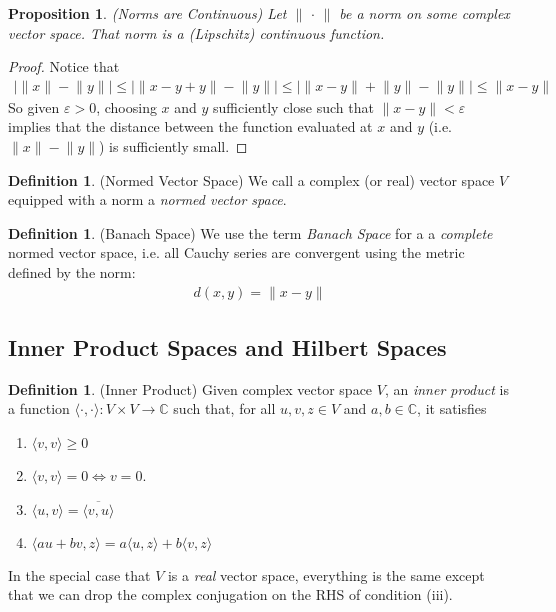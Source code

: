 \documentclass[12pt]{article}
\numberwithin{equation}{section} %
\theoremstyle{plain}
\newtheorem{prop}[thm]{Proposition}
\theoremstyle{definition}
\newtheorem{defn}[thm]{Definition}
\theoremstyle{remark}
\newcommand{\ra}{\rightarrow}
\newcommand{\C}{\mathbb{C}}
\begin{document}
\begin{prop}\emph{(Norms are Continuous)}
Let $\lVert \,\cdot\,\rVert$ be a norm on some complex vector space.
That norm is a (Lipschitz) continuous function.
\end{prop}
\begin{proof}
Notice that
\begin{align*}
    \big\lvert \lVert x \rVert - \lVert y\rVert \big\rvert
    \leq
    \big\lvert \lVert x - y + y\rVert - \lVert y\rVert \big\rvert
    \leq
    \big\lvert \lVert x - y \rVert + \lVert y\rVert - \lVert y\rVert \big\rvert
    \leq
    \lVert x - y \rVert
\end{align*}
So given $\varepsilon>0$, choosing $x$ and $y$ sufficiently close such
that $\lVert x-y\rVert<\varepsilon$ implies that the distance between
the function evaluated at $x$ and $y$ (i.e.
$\lVert x\rVert- \lVert y\rVert$) is sufficiently small.
\end{proof}

\begin{defn}(Normed Vector Space)
We call a complex (or real) vector space $V$ equipped with a norm a
\emph{normed vector space}.
\end{defn}


\begin{defn}(Banach Space)
We use the term \emph{Banach Space} for a a \emph{complete} normed
vector space, i.e. all Cauchy series are convergent using the metric
defined by the norm:
\begin{align*}
  d(x,y) = \lVert x-y\rVert
\end{align*}
\end{defn}


\clearpage
\subsection{Inner Product Spaces and Hilbert Spaces}

\begin{defn}(Inner Product)
Given complex vector space $V$, an \emph{inner product} is a function
$\langle \cdot, \cdot \rangle: V\times V \ra \C$ such that, for all
$u,v,z\in V$ and $a,b\in\C$, it satisfies
\begin{enumerate}[label=(\roman*)]
  \item $\langle v,v \rangle \geq 0$
  \item $\langle v,v\rangle =0 \iff v=0$.
  \item $\langle u,v\rangle = \overline{\langle v,u\rangle}$
  \item $\langle au + bv, z\rangle
    = a\langle u, z\rangle + b\langle v, z\rangle$
\end{enumerate}
In the special case that $V$ is a \emph{real} vector space, everything
is the same except that we can drop the complex conjugation on the RHS
of condition (iii).
\end{defn}
\end{document}
